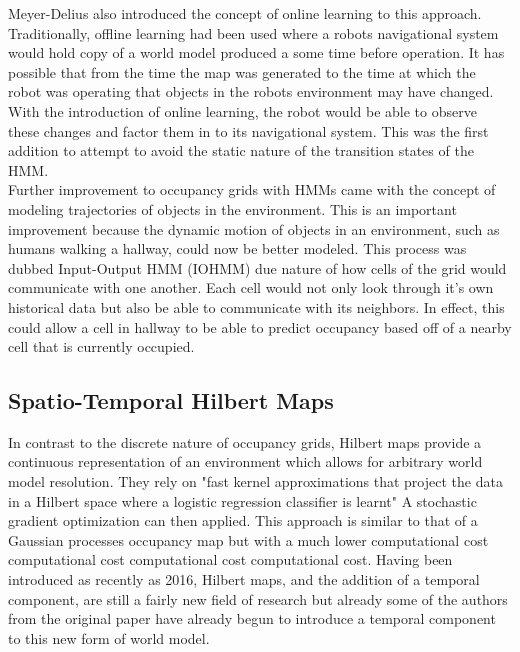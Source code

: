 Meyer-Delius \cite{Meyer-Delius2012} also introduced the concept of online
learning to this approach. Traditionally, offline learning had been used where
a robots navigational system would hold copy of a world model produced a some
time before operation. It has possible that from the time the map was generated
to the time at which the robot was operating that objects in the robots
environment may have changed. With the introduction of online learning, the
robot would be able to observe these changes and factor them in to its
navigational system. This was the first addition to attempt to avoid the static
nature of the transition states of the HMM. \\

Further improvement to occupancy grids with HMMs came with the concept of
modeling trajectories of objects in the environment\cite{Wang2015}. This is an
important improvement because the dynamic motion of objects in an environment,
such as humans walking a hallway, could now be better modeled. This process
was dubbed Input-Output HMM (IOHMM) due nature of how cells of the grid would
communicate with one another. Each cell would not only look through it's own
historical data but also be able to communicate with its neighbors. In effect,
this could allow a cell in hallway to be able to predict occupancy based off of
a nearby cell that is currently occupied.

\subsection{ Spatio-Temporal Hilbert Maps }

In contrast to the discrete nature of occupancy grids, Hilbert maps provide a
continuous representation of an environment which allows for arbitrary world
model resolution. They rely on "fast kernel approximations that project the
data in a Hilbert space where a logistic regression classifier is learnt"
A stochastic gradient optimization can then applied. This approach is similar to
that of a Gaussian processes occupancy map but with a much lower computational
cost computational cost computational cost computational cost. Having been
introduced as recently as 2016, Hilbert maps, and the addition of a temporal
component, are still a fairly new field of research but already some of the
authors from the original paper have already begun to introduce a temporal
component to this new form of world model. \cite{Ramos2016, Senanayake2016} \\

